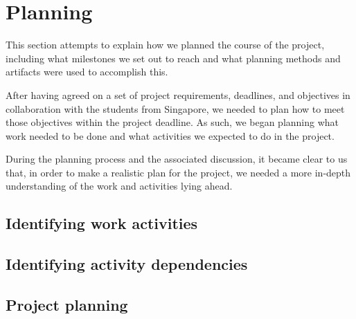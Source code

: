 \section{Planning}
This section attempts to explain how we planned the course of the project, including what
milestones we set out to reach and what planning methods and artifacts were used to
accomplish this.

After having agreed on a set of project requirements, deadlines, and objectives in
collaboration with the students from Singapore, we needed to plan how to meet those
objectives within the project deadline. As such, we began planning what work needed
to be done and what activities we expected to do in the project.

During the planning process and the associated discussion, it became clear to us that,
in order to make a realistic plan for the project, we needed a more in-depth understanding
of the work and activities lying ahead. 

\label{sec:EmpiriPlanning}
\subsection{Identifying work activities}

\subsection{Identifying activity dependencies}

\subsection{Project planning}
